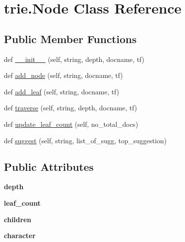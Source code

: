 \hypertarget{classtrie_1_1_node}{}\section{trie.\+Node Class Reference}
\label{classtrie_1_1_node}
\subsection*{Public Member Functions}
\begin{DoxyCompactItemize}
\item 
def \hyperlink{classtrie_1_1_node_aa69afd4739cf158324e3e8a93a5769d9}{\+\_\+\+\_\+init\+\_\+\+\_\+} (self, string, depth, docname, tf)
\item 
def \hyperlink{classtrie_1_1_node_a72026f7c23425c092ba4fd22b343e52d}{add\+\_\+node} (self, string, docname, tf)
\item 
def \hyperlink{classtrie_1_1_node_a450c43b9511ed6d30ddbf827979d16fd}{add\+\_\+leaf} (self, string, docname, tf)
\item 
def \hyperlink{classtrie_1_1_node_a466d5b2bdd9e8fbbd5b69038259b388b}{traverse} (self, string, depth, docname, tf)
\item 
def \hyperlink{classtrie_1_1_node_af6fdb2754e8a7af36cd5ede2426a6444}{update\+\_\+leaf\+\_\+count} (self, no\+\_\+total\+\_\+docs)
\item 
def \hyperlink{classtrie_1_1_node_af2ad8ae56effb8da0d5301f85717e599}{suggest} (self, string, list\+\_\+of\+\_\+sugg, top\+\_\+suggestion)
\end{DoxyCompactItemize}
\subsection*{Public Attributes}
\begin{DoxyCompactItemize}
\item 
{\bfseries depth}\hypertarget{classtrie_1_1_node_a1312b7e67b6012b37960e0f4d1a0190c}{}\label{classtrie_1_1_node_a1312b7e67b6012b37960e0f4d1a0190c}

\item 
{\bfseries leaf\+\_\+count}\hypertarget{classtrie_1_1_node_a697c4a8b684efa32dd2128e0ba92098a}{}\label{classtrie_1_1_node_a697c4a8b684efa32dd2128e0ba92098a}

\item 
{\bfseries children}\hypertarget{classtrie_1_1_node_ac307391049d0d89c012935be130933fc}{}\label{classtrie_1_1_node_ac307391049d0d89c012935be130933fc}

\item 
{\bfseries character}\hypertarget{classtrie_1_1_node_a68e789b347f2aef75414c8b91f353ec4}{}\label{classtrie_1_1_node_a68e789b347f2aef75414c8b91f353ec4}

\end{DoxyCompactItemize}


